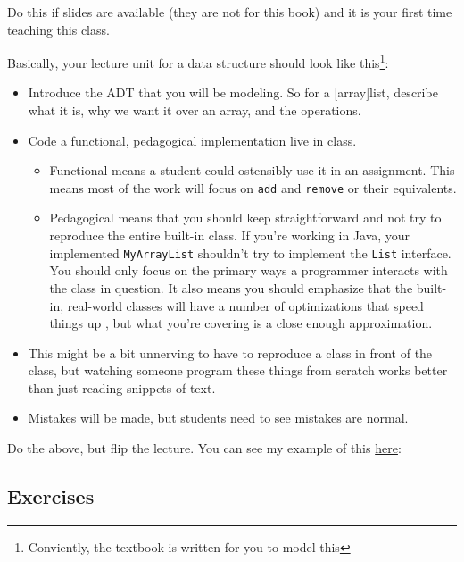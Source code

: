 \begin{description}
	\item[Lecture with slides.]  Do this if slides are available (they are not for this book) and it is your first time teaching this class.  
	\item[Lecture via live coding.] Basically, your lecture unit for a data structure should look like this\footnote{Conviently, the textbook is written for you to model this}:
	\begin{itemize}
		\item Introduce the ADT that you will be modeling.  So for a [array]list, describe what it is, why we want it over an array, and the operations.
		\item Code a functional, pedagogical implementation live in class.
		\begin{itemize}
			\item Functional means a student could ostensibly use it in an assignment.  This means most of the work will focus on \texttt{add} and  \texttt{remove} or their equivalents.
			\item Pedagogical means that you should keep straightforward  and not try to reproduce the entire built-in class.  If you're working in Java, your implemented \texttt{MyArrayList} shouldn't try to implement the \texttt{List} interface.  You should only focus on the primary ways a programmer interacts with the class in question. It also means you should emphasize that the built-in, real-world classes will have a number of optimizations that speed things up , but what you're covering is a close enough approximation.
		\end{itemize}
		\item This might be a bit unnerving to have to reproduce a class in front of the class, but watching someone program these things from scratch works better than just reading snippets of text.
		\item Mistakes will be made, but students need to see mistakes are normal.  
	\end{itemize}
	\item Do the above, but flip the lecture.  You can see my example of this
	\href{https://www.youtube.com/watch?v=FgnmWooD5Sg&list=PLNDWoTOY5hTYm38ST1lWvLy7uF4SgdtBx}{here}:
\end{description}

\subsection{Exercises}


